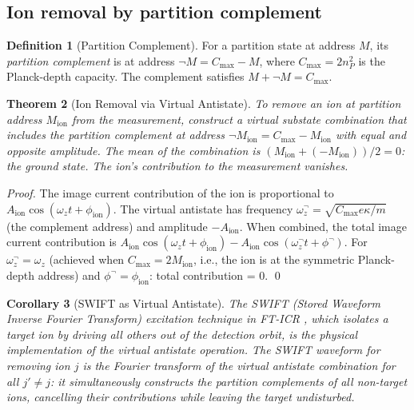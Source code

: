 \documentclass[twocolumn,10pt,a4paper]{article}
\theoremstyle{thmstyle}
\newtheorem{theorem}{Theorem}[section]
\newtheorem{corollary}[theorem]{Corollary}
\theoremstyle{definition}
\newtheorem{definition}[theorem]{Definition}
\theoremstyle{remark}
\newcommand{\Cmax}{C_{\max}}
\begin{document}
\subsection{Ion removal by partition complement}

\begin{definition}[Partition Complement]
For a partition state at address $M$, its \emph{partition complement} is
at address $\lnot M = \Cmax - M$, where $\Cmax = 2n_P^2$ is the
Planck-depth capacity. The complement satisfies $M + \lnot M = \Cmax$.
\end{definition}

\begin{theorem}[Ion Removal via Virtual Antistate]
\label{thm:removal}
To remove an ion at partition address $M_{\text{ion}}$ from the
measurement, construct a virtual substate combination that includes
the partition complement at address $\lnot M_{\text{ion}} = \Cmax - M_{\text{ion}}$
with equal and opposite amplitude. The mean of the combination is
$(M_{\text{ion}} + (-M_{\text{ion}}))/2 = 0$: the ground state.
The ion's contribution to the measurement vanishes.
\end{theorem}

\begin{proof}
The image current contribution of the ion is proportional to
$A_{\text{ion}}\cos(\omega_z t + \phi_{\text{ion}})$. The virtual
antistate has frequency $\omega_z^{\lnot} = \sqrt{\Cmax e\kappa/m}$
(the complement address) and amplitude $-A_{\text{ion}}$. When
combined, the total image current contribution is
$A_{\text{ion}}\cos(\omega_z t + \phi_{\text{ion}}) - A_{\text{ion}}\cos(\omega_z^{\lnot} t + \phi^{\lnot})$.
For $\omega_z^{\lnot} = \omega_z$ (achieved when $\Cmax = 2M_{\text{ion}}$,
i.e., the ion is at the symmetric Planck-depth address) and
$\phi^{\lnot} = \phi_{\text{ion}}$: total contribution = 0. \qed
\end{proof}

\begin{corollary}[SWIFT as Virtual Antistate]
\label{cor:swift}
The SWIFT (Stored Waveform Inverse Fourier Transform) excitation technique
in FT-ICR \citep{swift1985}, which isolates a target ion by driving all
others out of the detection orbit, is the physical implementation of the
virtual antistate operation. The SWIFT waveform for removing ion $j$ is
the Fourier transform of the virtual antistate combination for all
$j' \neq j$: it simultaneously constructs the partition complements of
all non-target ions, cancelling their contributions while leaving the
target undisturbed.
\end{corollary}
\end{document}
